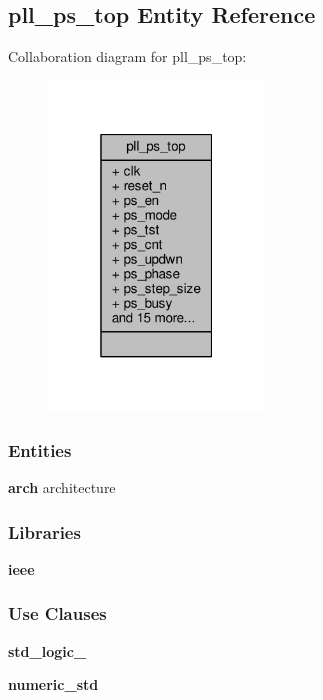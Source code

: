 \subsection{pll\+\_\+ps\+\_\+top Entity Reference}
\label{classpll__ps__top}


Collaboration diagram for pll\+\_\+ps\+\_\+top\+:\nopagebreak
\begin{figure}[H]
\begin{center}
\leavevmode
\includegraphics[width=163pt]{de/d7d/classpll__ps__top__coll__graph}
\end{center}
\end{figure}
\subsubsection*{Entities}
\begin{DoxyCompactItemize}
\item 
{\bf arch} architecture
\end{DoxyCompactItemize}
\subsubsection*{Libraries}
 \begin{DoxyCompactItemize}
\item 
{\bf ieee} 
\end{DoxyCompactItemize}
\subsubsection*{Use Clauses}
 \begin{DoxyCompactItemize}
\item 
{\bf std\+\_\+logic\+\_}   
\item 
{\bf numeric\+\_\+std}   
\end{DoxyCompactItemize}
